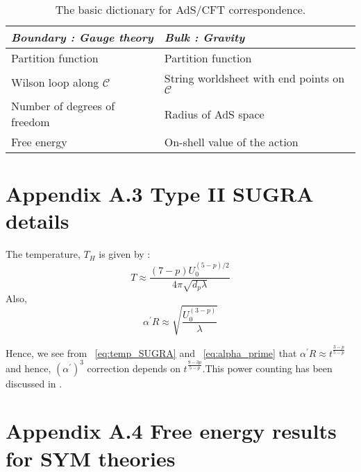 \begin {table}[htbp] 
\begin{center}
\begin{tabular}{ |  p{8cm} |  p{8cm} |}
    \hline
    \emph{Boundary : Gauge theory}  & \emph{Bulk : Gravity }   \\ \hline \hline 
    Partition function   &  Partition function \\ \hline 
     Wilson loop along $\mathcal{C}$ & String worldsheet with end points on $\mathcal{C}$  \\ \hline 
     Number of degrees of freedom & Radius of AdS space  \\ \hline
     Free energy & On-shell value of the action  \\ \hline
\end{tabular}
\vspace{3mm}
\caption {The basic dictionary for AdS/CFT correspondence. } 
\end{center}
\end {table}


\noindent \section*{\label{app:spinors} Appendix A.3 Type II SUGRA details}

The temperature, $T_{H}$ is given by : 
\begin{equation}
\label{eq:temp_SUGRA}
T \approx \frac{(7-p) U_{0}^{(5-p)/2}}{4 \pi \sqrt{d_{p} \lambda}}
\end{equation}
Also, 
\begin{equation}
  \label{eq:alpha_prime}
\alpha^{\prime} R \approx \sqrt{\frac{U_{0}^{(3-p)}}{\lambda}}
\end{equation}

Hence, we see from ~\ref{eq:temp_SUGRA} and ~\ref{eq:alpha_prime} that $ \alpha^{\prime} R \approx t^{\frac{3-p}{5-p}}$ and hence, $ (\alpha^{\prime})^3$ correction depends on $t^{\frac{9-3p}{5-p}}$.This power counting has been discussed in \cite{Berkowitz:2016jlq}.




\section*{\label{app:energy1} Appendix A.4 Free energy results for SYM theories}

